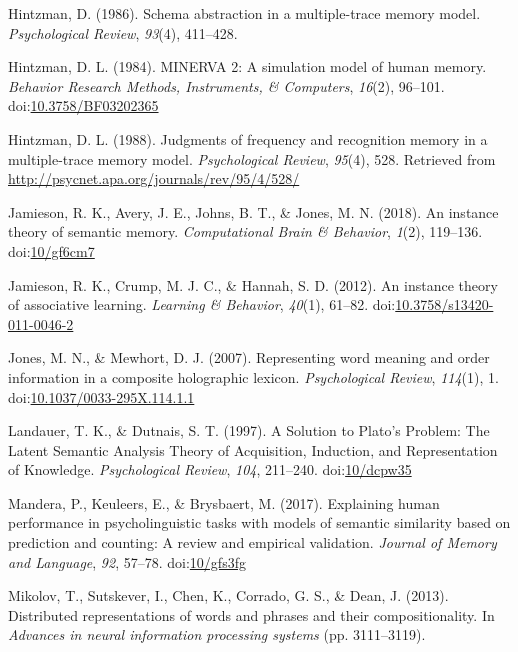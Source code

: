 \documentclass[
  jou]{apa6}
\newlength{\cslhangindent}
\newenvironment{cslreferences}%
  {\setlength{\parindent}{0pt}%
  \everypar{\setlength{\hangindent}{\cslhangindent}}\ignorespaces}%
  {\par}
\begin{document}
\hypertarget{refs}{}
\begin{cslreferences}
\leavevmode\hypertarget{ref-hintzmanSchemaAbstractionMultipletrace1986}{}%
Hintzman, D. (1986). Schema abstraction in a multiple-trace memory model. \emph{Psychological Review}, \emph{93}(4), 411--428.

\leavevmode\hypertarget{ref-hintzmanMINERVASimulationModel1984}{}%
Hintzman, D. L. (1984). MINERVA 2: A simulation model of human memory. \emph{Behavior Research Methods, Instruments, \& Computers}, \emph{16}(2), 96--101. doi:\href{https://doi.org/10.3758/BF03202365}{10.3758/BF03202365}

\leavevmode\hypertarget{ref-hintzmanJudgmentsFrequencyRecognition1988}{}%
Hintzman, D. L. (1988). Judgments of frequency and recognition memory in a multiple-trace memory model. \emph{Psychological Review}, \emph{95}(4), 528. Retrieved from \url{http://psycnet.apa.org/journals/rev/95/4/528/}

\leavevmode\hypertarget{ref-jamiesonInstanceTheorySemantic2018a}{}%
Jamieson, R. K., Avery, J. E., Johns, B. T., \& Jones, M. N. (2018). An instance theory of semantic memory. \emph{Computational Brain \& Behavior}, \emph{1}(2), 119--136. doi:\href{https://doi.org/10/gf6cm7}{10/gf6cm7}

\leavevmode\hypertarget{ref-jamiesonInstanceTheoryAssociative2012}{}%
Jamieson, R. K., Crump, M. J. C., \& Hannah, S. D. (2012). An instance theory of associative learning. \emph{Learning \& Behavior}, \emph{40}(1), 61--82. doi:\href{https://doi.org/10.3758/s13420-011-0046-2}{10.3758/s13420-011-0046-2}

\leavevmode\hypertarget{ref-jonesRepresentingWordMeaning2007}{}%
Jones, M. N., \& Mewhort, D. J. (2007). Representing word meaning and order information in a composite holographic lexicon. \emph{Psychological Review}, \emph{114}(1), 1. doi:\href{https://doi.org/10.1037/0033-295X.114.1.1}{10.1037/0033-295X.114.1.1}

\leavevmode\hypertarget{ref-landauerSolutionPlatoProblem1997}{}%
Landauer, T. K., \& Dutnais, S. T. (1997). A Solution to Plato's Problem: The Latent Semantic Analysis Theory of Acquisition, Induction, and Representation of Knowledge. \emph{Psychological Review}, \emph{104}, 211--240. doi:\href{https://doi.org/10/dcpw35}{10/dcpw35}

\leavevmode\hypertarget{ref-manderaExplainingHumanPerformance2017a}{}%
Mandera, P., Keuleers, E., \& Brysbaert, M. (2017). Explaining human performance in psycholinguistic tasks with models of semantic similarity based on prediction and counting: A review and empirical validation. \emph{Journal of Memory and Language}, \emph{92}, 57--78. doi:\href{https://doi.org/10/gfs3fg}{10/gfs3fg}

\leavevmode\hypertarget{ref-mikolovDistributedRepresentationsWords2013}{}%
Mikolov, T., Sutskever, I., Chen, K., Corrado, G. S., \& Dean, J. (2013). Distributed representations of words and phrases and their compositionality. In \emph{Advances in neural information processing systems} (pp. 3111--3119).
\end{cslreferences}

\endgroup
\end{document}
